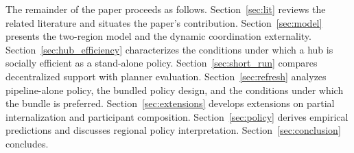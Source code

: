 The remainder of the paper proceeds as follows. Section~\ref{sec:lit} reviews the related literature and situates the paper's contribution. Section~\ref{sec:model} presents the two-region model and the dynamic coordination externality. Section~\ref{sec:hub_efficiency} characterizes the conditions under which a hub is socially efficient as a stand-alone policy. Section~\ref{sec:short_run} compares decentralized support with planner evaluation. Section~\ref{sec:refresh} analyzes pipeline-alone policy, the bundled policy design, and the conditions under which the bundle is preferred. Section~\ref{sec:extensions} develops extensions on partial internalization and participant composition. Section~\ref{sec:policy} derives empirical predictions and discusses regional policy interpretation. Section~\ref{sec:conclusion} concludes.
